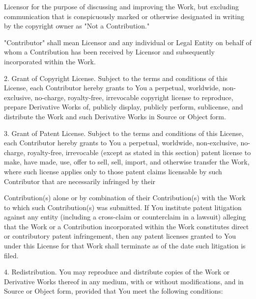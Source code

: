 \begin{DoxyVerb}
 Licensor for the purpose of discussing and improving the Work, but
 excluding communication that is conspicuously marked or otherwise
 designated in writing by the copyright owner as "Not a Contribution."

 "Contributor" shall mean Licensor and any individual or Legal Entity
 on behalf of whom a Contribution has been received by Licensor and
 subsequently incorporated within the Work.

 2. Grant of Copyright License. Subject to the terms and conditions of
 this License, each Contributor hereby grants to You a perpetual,
 worldwide, non-exclusive, no-charge, royalty-free, irrevocable
 copyright license to reproduce, prepare Derivative Works of,
 publicly display, publicly perform, sublicense, and distribute the
 Work and such Derivative Works in Source or Object form.

 3. Grant of Patent License. Subject to the terms and conditions of
 this License, each Contributor hereby grants to You a perpetual,
 worldwide, non-exclusive, no-charge, royalty-free, irrevocable
 (except as stated in this section) patent license to make, have made,
 use, offer to sell, sell, import, and otherwise transfer the Work,
 where such license applies only to those patent claims licensable
 by such Contributor that are necessarily infringed by their

 Contribution(s) alone or by combination of their Contribution(s)
 with the Work to which such Contribution(s) was submitted. If You
 institute patent litigation against any entity (including a
 cross-claim or counterclaim in a lawsuit) alleging that the Work
 or a Contribution incorporated within the Work constitutes direct
 or contributory patent infringement, then any patent licenses
 granted to You under this License for that Work shall terminate
 as of the date such litigation is filed.

 4. Redistribution. You may reproduce and distribute copies of the
 Work or Derivative Works thereof in any medium, with or without
 modifications, and in Source or Object form, provided that You
 meet the following conditions:


\end{DoxyVerb}
